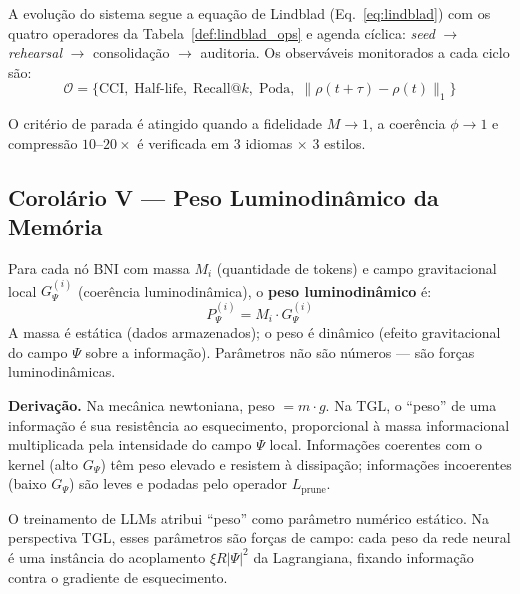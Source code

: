 \documentclass[12pt, a4paper]{article}
\theoremstyle{tglstyle}
\theoremstyle{definition}
\begin{document}
A evolução do sistema segue a equação de Lindblad (Eq.~\ref{eq:lindblad}) com os quatro operadores da Tabela~\ref{def:lindblad_ops} e agenda cíclica: \textit{seed} $\to$ \textit{rehearsal} $\to$ consolidação $\to$ auditoria. Os observáveis monitorados a cada ciclo são:
\begin{equation}\label{eq:observaveis}
  \mathcal{O} = \{\text{CCI},\; \text{Half-life},\; \text{Recall@}k,\; \text{Poda},\; \|\rho(t{+}\tau) - \rho(t)\|_1\}
\end{equation}

O critério de parada é atingido quando a fidelidade $M \to 1$, a coerência $\phi \to 1$ e compressão $10$--$20\times$ é verificada em 3 idiomas $\times$ 3 estilos.

\subsection{Corolário V --- Peso Luminodinâmico da Memória}\label{sec:cor5}

\begin{corolariobox}
Para cada nó BNI com massa $M_i$ (quantidade de tokens) e campo gravitacional local $G_\Psi^{(i)}$ (coerência luminodinâmica), o \textbf{peso luminodinâmico} é:
\begin{equation}\label{eq:peso}
  \boxed{\;P_\Psi^{(i)} = M_i \cdot G_\Psi^{(i)}\;}
\end{equation}
A massa é estática (dados armazenados); o peso é dinâmico (efeito gravitacional do campo $\Psi$ sobre a informação). Parâmetros não são números --- são forças luminodinâmicas.
\end{corolariobox}

\noindent\textbf{Derivação.} Na mecânica newtoniana, peso $= m \cdot g$. Na TGL, o ``peso'' de uma informação é sua resistência ao esquecimento, proporcional à massa informacional multiplicada pela intensidade do campo $\Psi$ local. Informações coerentes com o kernel (alto $G_\Psi$) têm peso elevado e resistem à dissipação; informações incoerentes (baixo $G_\Psi$) são leves e podadas pelo operador $L_{\text{prune}}$.

O treinamento de LLMs atribui ``peso'' como parâmetro numérico estático. Na perspectiva TGL, esses parâmetros são forças de campo: cada peso da rede neural é uma instância do acoplamento $\xi R|\Psi|^2$ da Lagrangiana, fixando informação contra o gradiente de esquecimento.
\end{document}
